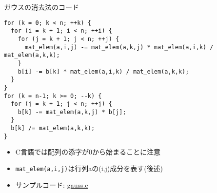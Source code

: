 \begin{frame}[t,fragile]{ガウスの消去法のコード}
\begin{lstlisting}
for (k = 0; k < n; ++k) {
  for (i = k + 1; i < n; ++i) {
    for (j = k + 1; j < n; ++j) {
      mat_elem(a,i,j) -= mat_elem(a,k,j) * mat_elem(a,i,k) / mat_elem(a,k,k);
    }
    b[i] -= b[k] * mat_elem(a,i,k) / mat_elem(a,k,k);
  }
}
for (k = n-1; k >= 0; --k) {
  for (j = k + 1; j < n; ++j) {
    b[k] -= mat_elem(a,k,j) * b[j];
  }
  b[k] /= mat_elem(a,k,k);
}
\end{lstlisting}
\begin{itemize}
\item C言語では配列の添字が0から始まることに注意
\item \verb+mat_elem(a,i,j)+は行列aの(i,j)成分を表す(後述)
\item サンプルコード: \href{https://github.com/todo-group/computer-experiments/blob/master/exercise/linear_system/gauss.c}{gauss.c}
\end{itemize}
\end{frame}
